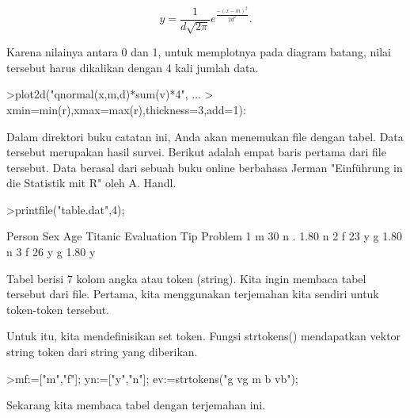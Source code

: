 \documentclass[12pt,Times new roman,letterpaper]{book}
\begin{document}
\begin{eulernootebook}
\begin{eulercomment}
\begin{eulercomment}
\begin{eulernootebook}
\begin{eulercomment}
\begin{eulercomment}
\begin{eulercomment}
\begin{eulercomment}
\begin{eulercomment}
\begin{eulercomment}
\begin{eulercomment}
\begin{eulercomment}
\end{eulercomment}
\begin{eulerformula}
\[
y=\frac{1}{d\sqrt{2\pi}}e^{\frac{-(x-m)^2}{2d^2}}.
\]
\end{eulerformula}
\begin{eulercomment}
Karena nilainya antara 0 dan 1, untuk memplotnya pada diagram batang,
nilai tersebut harus dikalikan dengan 4 kali jumlah data.
\end{eulercomment}
\begin{eulerprompt}
>plot2d("qnormal(x,m,d)*sum(v)*4", ...
>  xmin=min(r),xmax=max(r),thickness=3,add=1):
\end{eulerprompt}
\begin{eulercomment}
Dalam direktori buku catatan ini, Anda akan menemukan file dengan
tabel. Data tersebut merupakan hasil survei. Berikut adalah empat
baris pertama dari file tersebut. Data berasal dari sebuah buku online
berbahasa Jerman "Einführung in die Statistik mit R" oleh A. Handl.
\end{eulercomment}
\begin{eulerprompt}
>printfile("table.dat",4);
\end{eulerprompt}
\begin{euleroutput}
  Person Sex Age Titanic Evaluation Tip Problem
  1 m 30 n . 1.80 n
  2 f 23 y g 1.80 n
  3 f 26 y g 1.80 y
\end{euleroutput}
\begin{eulercomment}
Tabel berisi 7 kolom angka atau token (string). Kita ingin membaca
tabel tersebut dari file. Pertama, kita menggunakan terjemahan kita
sendiri untuk token-token tersebut.

Untuk itu, kita mendefinisikan set token. Fungsi strtokens()
mendapatkan vektor string token dari string yang diberikan.
\end{eulercomment}
\begin{eulerprompt}
>mf:=["m","f"]; yn:=["y","n"]; ev:=strtokens("g vg m b vb");
\end{eulerprompt}
\begin{eulercomment}
Sekarang kita membaca tabel dengan terjemahan ini.


\end{eulercomment}
\end{eulercomment}
\end{eulercomment}
\end{eulercomment}
\end{eulercomment}
\end{eulercomment}
\end{eulercomment}
\end{eulercomment}
\end{eulernootebook}
\end{eulercomment}
\end{eulercomment}
\end{eulernootebook}
\end{document}
